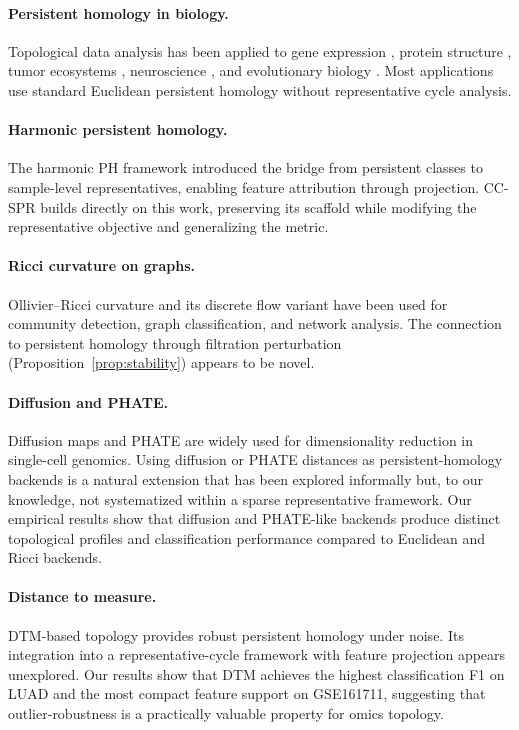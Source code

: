 \documentclass[11pt]{article}
\begin{document}
\paragraph{Persistent homology in biology.}
Topological data analysis has been applied to gene expression \cite{rizvi2017}, protein structure \cite{xia2014}, tumor ecosystems \cite{vipond2021}, neuroscience \cite{giusti2015}, and evolutionary biology \cite{chan2013topology}.
Most applications use standard Euclidean persistent homology without representative cycle analysis.

\paragraph{Harmonic persistent homology.}
The harmonic PH framework \cite{harmonicPH} introduced the bridge from persistent classes to sample-level representatives, enabling feature attribution through projection.
CC-SPR builds directly on this work, preserving its scaffold while modifying the representative objective and generalizing the metric.

\paragraph{Ricci curvature on graphs.}
Ollivier--Ricci curvature \cite{ollivier2007, ollivier2009} and its discrete flow variant \cite{ni2019community} have been used for community detection, graph classification, and network analysis.
The connection to persistent homology through filtration perturbation (Proposition~\ref{prop:stability}) appears to be novel.

\paragraph{Diffusion and PHATE.}
Diffusion maps \cite{coifman2006diffusion} and PHATE \cite{moon2019phate} are widely used for dimensionality reduction in single-cell genomics.
Using diffusion or PHATE distances as persistent-homology backends is a natural extension that has been explored informally but, to our knowledge, not systematized within a sparse representative framework.
Our empirical results show that diffusion and PHATE-like backends produce distinct topological profiles and classification performance compared to Euclidean and Ricci backends.

\paragraph{Distance to measure.}
DTM-based topology \cite{chazal2011dtm, chazal2017robust} provides robust persistent homology under noise.
Its integration into a representative-cycle framework with feature projection appears unexplored.
Our results show that DTM achieves the highest classification F1 on LUAD and the most compact feature support on GSE161711, suggesting that outlier-robustness is a practically valuable property for omics topology.
\end{document}

